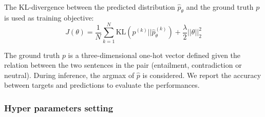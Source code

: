 The KL-divergence between the predicted distribution $\hat{p}_{\theta}$ and the ground truth $p$ is used as training objective:
\begin{equation}
J(\theta) = \frac{1}{N}\sum_{k=1}^{N}\text{KL}(p^{(k)} \Big|\Big| \hat{p}_{\theta}^{(k)}) + \frac{\lambda}{2}||\theta||_{2}^{2}
\end{equation}

The ground truth $p$ is a three-dimensional one-hot vector defined given the relation between the two sentences in the pair (entailment, contradiction or neutral). During inference, the argmax of $\hat{p}$ is considered. We report the accuracy between targets and predictions to evaluate the performances.




\subsubsection{Hyper parameters setting}

